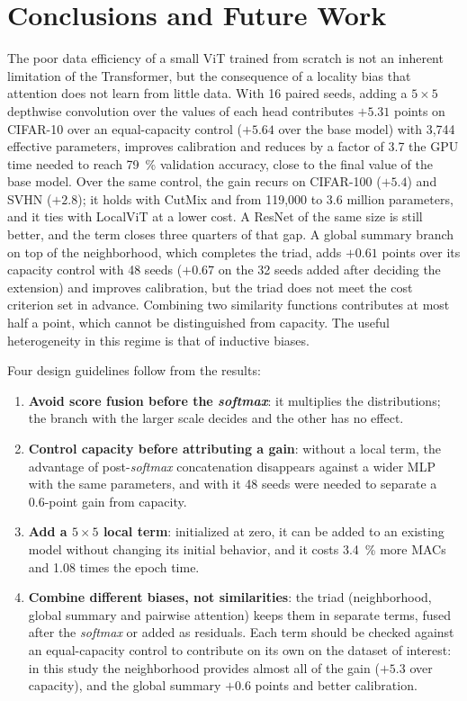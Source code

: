 \section{Conclusions and Future Work}
\label{sec:conclusiones}
The poor data efficiency of a small ViT trained from scratch is not an inherent limitation of the Transformer, but the consequence of a locality bias that attention does not learn from little data. With 16 paired seeds, adding a $5\times5$ depthwise convolution over the values of each head contributes $+5.31$ points on CIFAR-10 over an equal-capacity control ($+5.64$ over the base model) with 3,744 effective parameters, improves calibration and reduces by a factor of 3.7 the GPU time needed to reach 79~\% validation accuracy, close to the final value of the base model. Over the same control, the gain recurs on CIFAR-100 ($+5.4$) and SVHN ($+2.8$); it holds with CutMix and from 119,000 to 3.6 million parameters, and it ties with LocalViT at a lower cost. A ResNet of the same size is still better, and the term closes three quarters of that gap. A global summary branch on top of the neighborhood, which completes the triad, adds $+0.61$ points over its capacity control with 48 seeds ($+0.67$ on the 32 seeds added after deciding the extension) and improves calibration, but the triad does not meet the cost criterion set in advance. Combining two similarity functions contributes at most half a point, which cannot be distinguished from capacity. The useful heterogeneity in this regime is that of inductive biases.

Four design guidelines follow from the results:
\begin{enumerate}
  \item \textbf{Avoid score fusion before the \emph{softmax}}: it multiplies the distributions; the branch with the larger scale decides and the other has no effect.
  \item \textbf{Control capacity before attributing a gain}: without a local term, the advantage of post-\emph{softmax} concatenation disappears against a wider MLP with the same parameters, and with it 48 seeds were needed to separate a 0.6-point gain from capacity.
  \item \textbf{Add a $5\times5$ local term}: initialized at zero, it can be added to an existing model without changing its initial behavior, and it costs 3.4~\% more MACs and 1.08 times the epoch time.
  \item \textbf{Combine different biases, not similarities}: the triad (neighborhood, global summary and pairwise attention) keeps them in separate terms, fused after the \emph{softmax} or added as residuals. Each term should be checked against an equal-capacity control to contribute on its own on the dataset of interest: in this study the neighborhood provides almost all of the gain ($+5.3$ over capacity), and the global summary $+0.6$ points and better calibration.
\end{enumerate}

